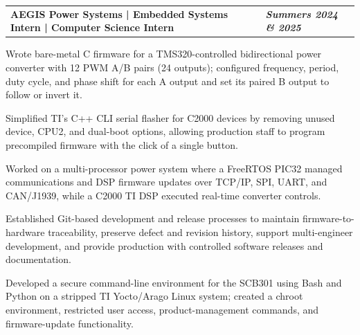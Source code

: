 \documentclass[10pt,letterpaper]{article}
\makeatletter
\newcommand{\resumeentry}[2]{%
  \begin{tabularx}{\textwidth}{@{}X>{\raggedleft\arraybackslash}p{2.40in}@{}}
    \textbf{#1} & \textbf{\textit{#2}}
  \end{tabularx}\vspace{-0.075cm}
}
\newcommand{\descriptorentry}[1]{%
  \begin{tabularx}{\textwidth}{@{}X>{\raggedleft\arraybackslash}p{2.40in}@{}}
    \textit{#1} &
  \end{tabularx}\vspace{-0.075cm}
}
\makeatother
\begin{document}
\resumeentry{AEGIS Power Systems | Embedded Systems Intern | Computer Science Intern}{Summers 2024 \& 2025}
\begin{resumebullets}
  \item Wrote bare-metal C firmware for a TMS320-controlled bidirectional power converter with 12 PWM A/B pairs (24 outputs); configured frequency, period, duty cycle, and phase shift for each A output and set its paired B output to follow or invert it.
  \item Simplified TI's C++ CLI serial flasher for C2000 devices by removing unused device, CPU2, and dual-boot options, allowing production staff to program precompiled firmware with the click of a single button.
  \item Worked on a multi-processor power system where a FreeRTOS PIC32 managed communications and DSP firmware updates over TCP/IP, SPI, UART, and CAN/J1939, while a C2000 TI DSP executed real-time converter controls.
  \item Established Git-based development and release processes to maintain firmware-to-hardware traceability, preserve defect and revision history, support multi-engineer development, and provide production with controlled software releases and documentation.
  
  \item Developed a secure command-line environment for the SCB301 using Bash and Python on a stripped TI Yocto/Arago Linux system; created a chroot environment, restricted user access, product-management commands, and firmware-update functionality.
\end{resumebullets}
\end{document}
